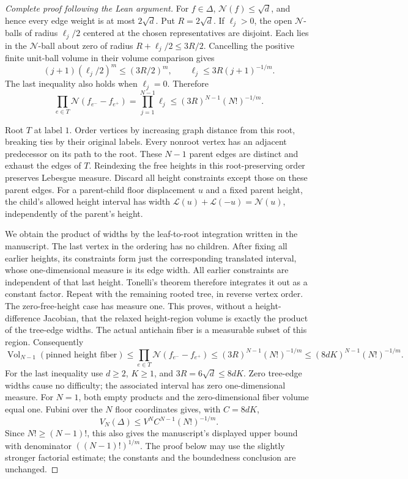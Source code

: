 \begin{proof}[Complete proof following the Lean argument]
For \(f\in\Delta\), \(\mathcal N(f)\le\sqrt d\), and hence every
edge weight is at most \(2\sqrt d\). Put \(R=2\sqrt d\).
If \(\ell_j>0\), the open \(\mathcal N\)-balls of radius
\(\ell_j/2\) centered at the chosen representatives are disjoint.
Each lies in the \(\mathcal N\)-ball about zero of radius
\(R+\ell_j/2\le3R/2\). Cancelling the positive finite unit-ball
volume in their volume comparison gives
\[
 (j+1)(\ell_j/2)^m\le(3R/2)^m,\qquad
 \ell_j\le3R(j+1)^{-1/m}.
\]
The last inequality also holds when \(\ell_j=0\). Therefore
\[
 \prod_{e\in T}\mathcal N(f_{e^-}-f_{e^+})
     =\prod_{j=1}^{N-1}\ell_j
     \le(3R)^{N-1}(N!)^{-1/m}.
\]

Root \(T\) at label \(1\). Order vertices by increasing graph distance
from this root, breaking ties by their original labels. Every nonroot
vertex has an adjacent predecessor on its path to the root. These
\(N-1\) parent edges are distinct and exhaust the edges of \(T\).
Reindexing the free heights in this root-preserving order preserves
Lebesgue measure. Discard all height constraints except those on these
parent edges. For a parent-child floor displacement \(u\) and a fixed
parent height, the child's allowed height interval has width
\(\mathcal L(u)+\mathcal L(-u)=\mathcal N(u)\), independently of the
parent's height.

We obtain the product of widths by the leaf-to-root integration written
in the manuscript. The last vertex in the ordering has no children.
After fixing all earlier heights, its constraints form just the
corresponding translated interval, whose one-dimensional measure is its
edge width. All earlier constraints are independent of that last height.
Tonelli's theorem therefore integrates it out as a constant factor.
Repeat with the remaining rooted tree, in reverse vertex order. The
zero-free-height case has measure one. This proves, without a
height-difference Jacobian, that the relaxed height-region volume is
exactly the product of the tree-edge widths. The actual antichain fiber
is a measurable subset of this region. Consequently
\[
 \operatorname{Vol}_{N-1}(\text{pinned height fiber})
     \le\prod_{e\in T}\mathcal N(f_{e^-}-f_{e^+})
     \le(3R)^{N-1}(N!)^{-1/m}
     \le(8dK)^{N-1}(N!)^{-1/m}.
\]
For the last inequality use \(d\ge2\), \(K\ge1\), and
\(3R=6\sqrt d\le8dK\).
Zero tree-edge widths cause no difficulty; the associated interval has
zero one-dimensional measure. For \(N=1\), both empty products and the
zero-dimensional fiber volume equal one.
Fubini over the \(N\) floor coordinates gives, with \(C=8dK\),
\[
                 V_N(\Delta)\le V^N C^{N-1}(N!)^{-1/m}.
\]
Since \(N!\ge(N-1)!\), this also gives the manuscript's displayed
upper bound with denominator \(((N-1)!)^{1/m}\). The proof below may
use the slightly stronger factorial estimate; the constants and the
boundedness conclusion are unchanged.


\end{proof}
